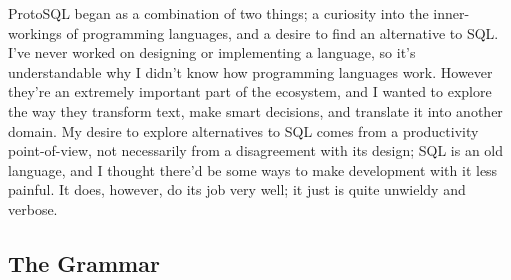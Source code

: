 \documentclass[titlepage]{article}
\begin{document}
		ProtoSQL began as a combination of two things; a curiosity into the inner-workings of programming languages, and a desire to find an alternative to SQL.  I've never worked on designing or implementing a language, so it's understandable why I didn't know how programming languages work.  However they're an extremely important part of the ecosystem, and I wanted to explore the way they transform text, make smart decisions, and translate it into another domain.  My desire to explore alternatives to SQL comes from a productivity point-of-view, not necessarily from a disagreement with its design; SQL is an old language, and I thought there'd be some ways to make development with it less painful.  It does, however, do its job very well; it just is quite unwieldy and verbose.

		\subsection{The Grammar}

			
\end{document}
